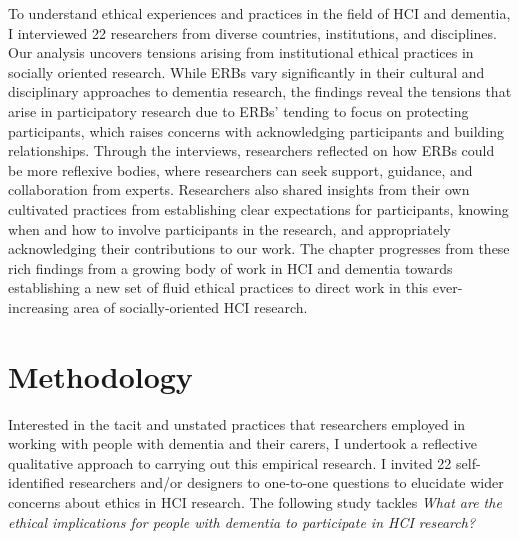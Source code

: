 To understand ethical experiences and practices in the field of HCI and dementia, I interviewed 22 researchers from diverse countries, institutions, and disciplines. Our analysis uncovers tensions arising from institutional ethical practices in socially oriented research. While ERBs vary significantly in their cultural and disciplinary approaches to dementia research, the findings reveal the tensions that arise in participatory research due to ERBs’ tending to focus on protecting participants, which raises concerns with acknowledging participants and building relationships. Through the interviews, researchers reflected on how ERBs could be more reflexive bodies, where researchers can seek support, guidance, and collaboration from experts. Researchers also shared insights from their own cultivated practices from establishing clear expectations for participants, knowing when and how to involve participants in the research, and appropriately acknowledging their contributions to our work. The chapter progresses from these rich findings from a growing body of work in HCI and dementia towards establishing a new set of fluid ethical practices to direct work in this ever-increasing area of socially-oriented HCI research. 

\section{Methodology}
\label{Ethics:Methodology}
Interested in the tacit and unstated practices that researchers employed in working with people with dementia and their carers, I undertook a reflective qualitative approach to carrying out this empirical research. I invited 22 self-identified researchers and/or designers to one-to-one questions to elucidate wider concerns about ethics in HCI research. The following study tackles \textit{What are the ethical implications for people with dementia to participate in HCI research?}

